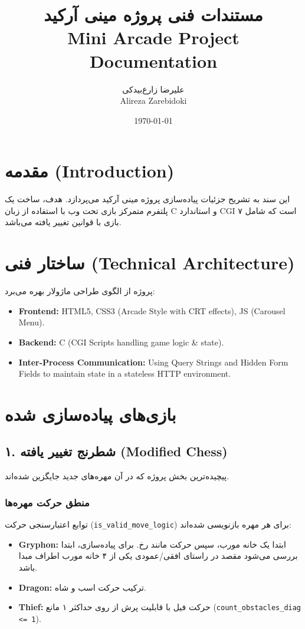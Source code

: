 \documentclass[12pt, a4paper]{article}
\title{\textbf{مستندات فنی پروژه مینی آرکید}\\
\large Mini Arcade Project Documentation}
\author{علیرضا زارع‌بیدکی \\ Alireza Zarebidoki}
\date{\today}
\begin{document}
\maketitle
\tableofcontents
\newpage

\section{مقدمه (Introduction)}
این سند به تشریح جزئیات پیاده‌سازی پروژه مینی آرکید می‌پردازد. هدف، ساخت یک پلتفرم متمرکز بازی تحت وب با استفاده از زبان C و استاندارد CGI است که شامل ۷ بازی با قوانین تغییر یافته می‌باشد.

\section{ساختار فنی (Technical Architecture)}
پروژه از الگوی طراحی ماژولار بهره می‌برد:
\begin{latin}
\begin{itemize}
    \item \textbf{Frontend:} HTML5, CSS3 (Arcade Style with CRT effects), JS (Carousel Menu).
    \item \textbf{Backend:} C (CGI Scripts handling game logic & state).
    \item \textbf{Inter-Process Communication:} Using Query Strings and Hidden Form Fields to maintain state in a stateless HTTP environment.
\end{itemize}
\end{latin}

\section{بازی‌های پیاده‌سازی شده}

\subsection{۱. شطرنج تغییر یافته (Modified Chess)}
پیچیده‌ترین بخش پروژه که در آن مهره‌های جدید جایگزین شده‌اند.
\subsubsection{منطق حرکت مهره‌ها}
توابع اعتبارسنجی حرکت (\texttt{is\_valid\_move\_logic}) برای هر مهره بازنویسی شده‌اند:
\begin{itemize}
    \item \textbf{Gryphon:} ابتدا یک خانه مورب، سپس حرکت مانند رخ. برای پیاده‌سازی، ابتدا بررسی می‌شود مقصد در راستای افقی/عمودی یکی از ۴ خانه مورب اطراف مبدا باشد.
    \item \textbf{Dragon:} ترکیب حرکت اسب و شاه.
    \item \textbf{Thief:} حرکت فیل با قابلیت پرش از روی حداکثر ۱ مانع (\texttt{count\_obstacles\_diag <= 1}).
\end{itemize}
\end{document}
